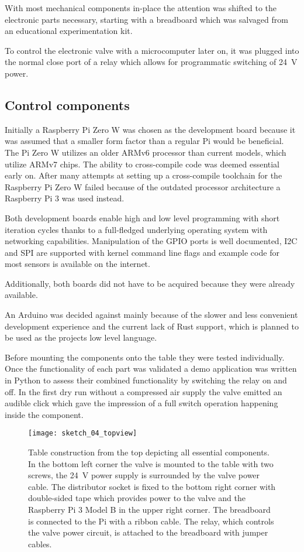With most mechanical components in-place the attention was shifted to the electronic parts necessary, starting with a breadboard which was salvaged from an educational experimentation kit. 

To control the electronic valve with a microcomputer later on, it was plugged into the normal close port of a relay which allows for programmatic switching of \SI{24}{\volt} power. 

\subsection{Control components}
Initially a Raspberry Pi Zero W \cite{raspberry-pi-zero} was chosen as the development board because it was assumed that a smaller form factor than a regular Pi would be beneficial. 
The Pi Zero W utilizes an older ARMv6 processor than current models, which utilize ARMv7 chips. 
The ability to cross-compile code was deemed essential early on. After many attempts at setting up a cross-compile toolchain for the Raspberry Pi Zero W failed because of the outdated processor architecture a Raspberry Pi 3 \cite{raspberry-pi} was used instead. 

Both development boards enable high and low level programming with short iteration cycles thanks to a full-fledged underlying operating system \cite{raspbian} with networking capabilities. Manipulation of the GPIO ports is well documented, I2C and SPI are supported with kernel command line flags and example code for most sensors is available on the internet.

Additionally, both boards did not have to be acquired because they were already available. 

An Arduino was decided against mainly because of the slower and less convenient development experience and the current lack of Rust \cite{rust} support, which is planned to be used as the projects low level language.

Before mounting the components onto the table they were tested individually. Once the functionality of each part was validated a demo application was written in Python to assess their combined functionality by switching the relay on and off. In the first dry run without a compressed air supply the valve emitted an audible click which gave the impression of a full switch operation happening inside the component.

\begin{figure}[h]
\centering

\texttt{[image: sketch\_04\_topview]}

\caption{Table construction from the top depicting all essential components. In the bottom left corner the valve is mounted to the table with two screws, the \SI{24}{\volt} power supply is surrounded by the valve power cable. The distributor socket is fixed to the bottom right corner with double-sided tape which provides power to the valve and the Raspberry Pi 3 Model B in the upper right corner. The breadboard is connected to the Pi with a ribbon cable. The relay, which controls the valve power circuit, is attached to the breadboard with jumper cables.}
\end{figure}

